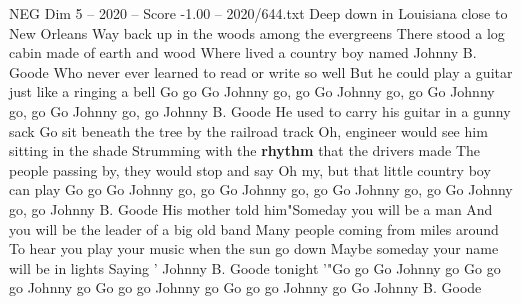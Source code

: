\begin{textsample}{NEG Dim 5 – 2020 – Score -1.00 – 2020/644.txt}  \label{ex:f5_neg_026}
Deep down in Louisiana close to New Orleans Way back up in the woods among the evergreens There stood a log cabin made of earth and wood Where lived a country boy named Johnny B.
Goode Who never ever learned to read or write so well But he could play a guitar just like a ringing a bell Go go Go Johnny go, go Go Johnny go, go Go Johnny go, go Go Johnny go, go Johnny B.
Goode He used to carry his guitar in a gunny sack Go sit beneath the tree by the railroad track Oh, engineer would see him sitting in the shade Strumming with the \textbf{rhythm} that the drivers made The people passing by, they would stop and say Oh my, but that little country boy can play Go go Go Johnny go, go Go Johnny go, go Go Johnny go, go Go Johnny go, go Johnny B.
Goode His mother told him"Someday you will be a man And you will be the leader of a big old band Many people coming from miles around To hear you play your music when the sun go down Maybe someday your name will be in lights Saying ' Johnny B.
Goode tonight '"Go go Go Johnny go Go go go Johnny go Go go go Johnny go Go go go Johnny go Go Johnny B.
Goode

\end{textsample}
